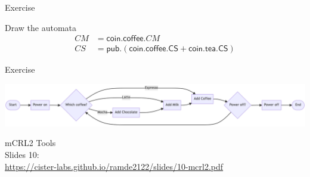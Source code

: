 \documentclass[aspectratio=169]{beamer}
\begin{document}
\begin{slide}{Exercise}
  \begin{exampleblock}{\exercise Draw the automata}
  \begin{align*}
    CM &= \mathsf{coin.coffee}.CM
    \\
    CS &= \mathsf{pub.(coin.coffee.CS + coin.tea.CS)}
  \end{align*}
\end{exampleblock}

\end{slide}


\begin{slide}{Exercise}
  \centering

  \includegraphics[width=1.0\textwidth]{images/diagrams/coffee-flow.png}


\end{slide}


\begin{frame}
  \huge\centering
  mCRL2 Tools
  \\[5mm]\large
  Slides 10:\\\url{https://cister-labs.github.io/ramde2122/slides/10-mcrl2.pdf}
\end{frame}

\end{document}
